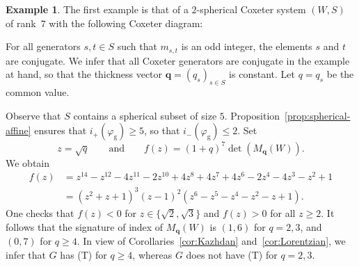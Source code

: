 \documentclass[12pt,a4paper]{amsproc}
\theoremstyle{definition}
\newtheorem{example}[theorem]{Example}
\newcommand{\qq}{\mathbf q}
\newcommand{\rg}{\mathrm g}
\begin{document}
\begin{example}\label{ex:1}
The first example is that of a $2$-spherical Coxeter system $(W, S)$ of rank~$7$ with the following Coxeter diagram:
\begin{center}
\end{center}
For all generators $s, t \in S$ such that $m_{s, t}$ is an odd integer, the elements $s$ and $t$ are conjugate. We infer that all Coxeter generators are conjugate in the example at hand, so that the thickness vector $\qq=(q_s)_{s \in S}$ is constant. Let $q= q_s $ be the common value. 

Observe that $S$ contains a spherical subset of size $5$. Proposition~\ref{prop:spherical-affine} ensures that $i_+(\varphi_\rg) \geq 5$, so that $i_-(\varphi_\rg) \leq 2$. Set 
$$z = \sqrt q \qquad \text{and} \qquad
f(z) = (1+q)^7 \det(M_\qq(W)).$$ 
We   obtain 
\begin{align*}
f(z) 
& =z^{14} - z^{12} - 4z^{11} - 2z^{10} + 4z^8 + 4z^7 + 4z^6 - 2z^4 - 4z^3 - z^2 + 1\\
&=(z^2+z+1)^3 (z-  1 )^2 (z^6 - z^5 - z^4 - z^2 - z + 1).
\end{align*}
One checks that $f(z)<0$ for $z \in   \{\sqrt 2, \sqrt 3\}$ and $f(z)>0$ for all $z \geq 2$. It follows that the signature of  index of $M_\qq(W)$ is $(1, 6)$  for $q=2, 3$, and $(0, 7)$ for $q \geq 4$. In view of Corollaries~\ref{cor:Kazhdan} and~\ref{cor:Lorentzian}, we infer  that $G$ has (T) for $q \geq 4$, whereas $G$ does not have (T) for $q =2, 3$.
\end{example}
\end{document}
